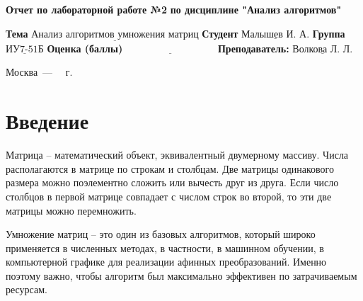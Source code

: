 \documentclass[12pt]{report}
\begin{document}
\begin{titlepage}
	
	\begin{center}
		\noindent\begin{minipage}{1.3\textwidth}\centering
			\Large\textbf{  Отчет по лабораторной работе №2}\newline
			\textbf{по дисциплине "Анализ алгоритмов"}\newline\newline
		\end{minipage}
	\end{center}
	
	\noindent\textbf{Тема} $\underline{\text{Анализ алгоритмов умножения матриц}}$\newline\newline
	\noindent\textbf{Студент} $\underline{\text{Малышев И. А.}}$\newline\newline
	\noindent\textbf{Группа} $\underline{\text{ИУ7-51Б}}$\newline\newline
	\noindent\textbf{Оценка (баллы)} $\underline{\text{~~~~~~~~~~~~~~~~~~~~~~~~~~~}}$\newline\newline
	\noindent\textbf{Преподаватель: } $\underline{\text{Волкова Л. Л.}}$\newline\newline\newline
	
	\begin{center}
		\vfill
		Москва~---~\the\year
		~г.
	\end{center}
\end{titlepage}


\tableofcontents
  
\newpage
\chapter*{Введение}

Матрица -- математический объект, эквивалентный двумерному массиву. Числа располагаются в матрице по строкам и столбцам. Две матрицы одинакового размера можно поэлементно сложить или вычесть друг из друга. Если число столбцов в первой матрице совпадает с числом строк во второй, то эти две матрицы можно перемножить.

Умножение матриц -- это один из базовых алгоритмов, который широко применяется в численных методах, в частности, в машинном обучении, в компьютерной графике для реализации афинных преобразований. Именно поэтому важно, чтобы алгоритм был максимально эффективен по затрачиваемым ресурсам. 
\end{document}
